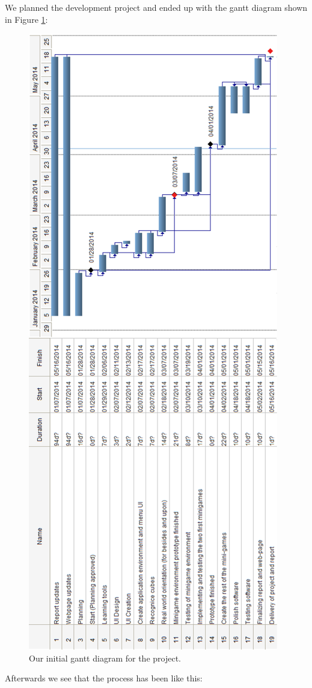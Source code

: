 We planned the development project and ended up with the gantt diagram shown in Figure \ref{fig:preplan_gantt}:

\begin{figure}[h]
	\label{fig:preplan_gantt}
	\centering
	\includegraphics[height=\textwidth, angle=270]{preplan_gantt_diagram}
	\caption[Preplan Gantt diagram]{Our initial gantt diagram for the project.}
\end{figure}


Afterwards we see that the process has been like this:






